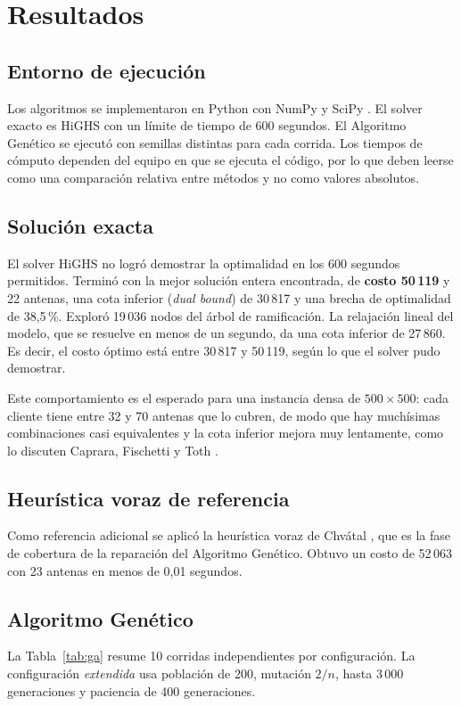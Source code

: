 \section{Resultados}

\subsection{Entorno de ejecución}
Los algoritmos se implementaron en Python con NumPy y SciPy \cite{scipy20}. El solver exacto es HiGHS \cite{highs18} con un límite de tiempo de 600 segundos. El Algoritmo Genético se ejecutó con semillas distintas para cada corrida. Los tiempos de cómputo dependen del equipo en que se ejecuta el código, por lo que deben leerse como una comparación relativa entre métodos y no como valores absolutos.

\subsection{Solución exacta}
El solver HiGHS no logró demostrar la optimalidad en los 600 segundos permitidos. Terminó con la mejor solución entera encontrada, de \textbf{costo 50\,119} y 22 antenas, una cota inferior (\textit{dual bound}) de 30\,817 y una brecha de optimalidad de 38,5\,\%. Exploró 19\,036 nodos del árbol de ramificación. La relajación lineal del modelo, que se resuelve en menos de un segundo, da una cota inferior de 27\,860. Es decir, el costo óptimo está entre 30\,817 y 50\,119, según lo que el solver pudo demostrar.

Este comportamiento es el esperado para una instancia densa de $500\times500$: cada cliente tiene entre 32 y 70 antenas que lo cubren, de modo que hay muchísimas combinaciones casi equivalentes y la cota inferior mejora muy lentamente, como lo discuten Caprara, Fischetti y Toth \cite{caprara00}.

\subsection{Heurística voraz de referencia}
Como referencia adicional se aplicó la heurística voraz de Chv\'atal \cite{chvatal79}, que es la fase de cobertura de la reparación del Algoritmo Genético. Obtuvo un costo de 52\,063 con 23 antenas en menos de 0,01 segundos.

\subsection{Algoritmo Genético}
La Tabla~\ref{tab:ga} resume 10 corridas independientes por configuración. La configuración \textit{extendida} usa población de 200, mutación $2/n$, hasta 3\,000 generaciones y paciencia de 400 generaciones.

